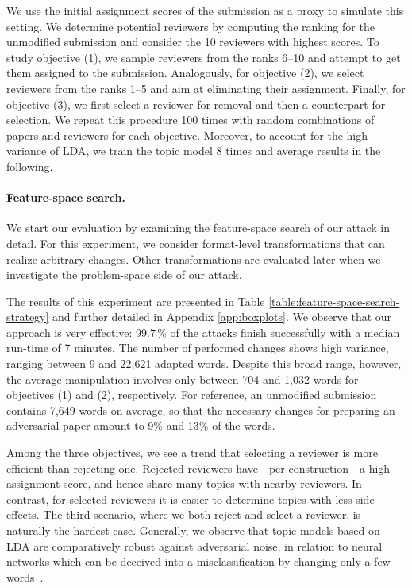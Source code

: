 \documentclass[letterpaper,twocolumn,10pt]{article}
\begin{document}
We use the initial assignment scores of the submission as a proxy to simulate this setting. We determine potential reviewers by computing the ranking for the unmodified submission and consider the 10 reviewers with highest scores. To study objective (1), we sample reviewers from the ranks 6--10 and attempt to get them assigned to the submission. Analogously, for objective (2), we select reviewers from the ranks 1--5 and aim at eliminating their assignment. Finally, for objective (3), we first select a reviewer for removal and then a counterpart for selection. We repeat this procedure 100 times with random combinations of papers and reviewers for each objective. Moreover, to account for the high variance of {LDA\EndAccSupp{}}, we train the topic model 8 times and average results in the following.


\paragraph{Feature-space search.} 

We start our evaluation by examining the feature-space search of our attack in detail. For this experiment, we consider format-level transformations that can realize arbitrary changes. Other transformations are evaluated later when we investigate the problem-space side of our attack.

The results of this experiment are presented in Table \ref{table:feature-space-search-strategy} and further detailed in Appendix \ref{app:boxplots}. We observe that our approach is very effective: 99.7\,\% of the attacks finish successfully with a median run-time of 7 minutes.
The number of performed changes shows high variance, ranging between 9 and 22,621 adapted words. Despite this broad range, however, the average manipulation involves only between 704 and 1,032 words for objectives (1) and (2), respectively. For reference, an unmodified submission contains 7,649 words on average, so that the necessary changes for preparing an adversarial paper amount to 9\% and 13\% of the words.  

Among the three objectives, we see a trend that selecting a reviewer is more efficient than rejecting one. Rejected reviewers have---per construction---a high assignment score, and hence share many topics with {nearby\EndAccSupp{}} reviewers. In contrast, for selected reviewers it is easier to determine topics with less side effects. The third scenario, where we both reject and select a reviewer, is naturally the {hardest\EndAccSupp{}} case. Generally, we observe that topic models based on \ac{LDA} are comparatively robust against adversarial noise, in relation to {neural\EndAccSupp{}} networks which can be {deceived\EndAccSupp{}} into a {misclassification\EndAccSupp{}} by changing only a few words~\cite[e.g.,][]{gao-18-blackbox, li-19-textbugger}.
\end{document}
